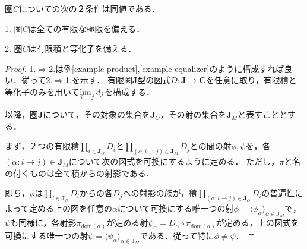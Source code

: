 \documentclass[uplatex, 12pt, dvipdfmx]{jsarticle}
\begin{document}
\begin{proposition}\label{prop-necessaries-for-limits}
    圏$C$についての次の２条件は同値である．

    1. 圏$C$は全ての有限な極限を備える．

    2. 圏$C$は有限積と等化子を備える．
\end{proposition}
\begin{proof}
    1.$\Rightarrow$2.は例\ref{example-product},\ref{example-equalizer}のように構成すれば良い．従って2.$\Rightarrow$1.を示す．
    有限圏$\mathbf{J}$型の図式$D:\mathbf{J}\to\mathbf{C}$を任意に取り，有限積と等化子のみを用いて$\varprojlim_{j}d_j$を構成する．

    以降，圏$\mathbf{J}$について，その対象の集合を$\mathbf{J}_O$，その射の集合を$\mathbf{J}_M$と表すこととする．
    
    まず，２つの有限積$\prod_{i\in\mathbf{J}_O}D_i$と$\prod_{(\alpha:i\to j)\in\mathbf{J}_M}D_j$との間の射$\phi,\psi$を，各$(\alpha:i\to j)\in\mathbf{J}_M$について次の図式を可換にするように定める．
    ただし，$\pi$と名の付くものは全て積からの射影である．
    \begin{center}
    \end{center}
    即ち，$\phi$は$\prod_{i\in\mathbf{J}_O}D_i$からの各$D_j$への射影の族が，積$\prod_{(\alpha:i\to j)\in\mathbf{J}_O}D_i$の普遍性によって定める上の図を任意の$\alpha$について可換にする唯一つの射$\phi=\langle\phi_\alpha\rangle_{\alpha\in\mathbf{J}_M}$で，$\psi$も同様に，各射影$\pi_{\mathrm{dom}(\alpha)}$が定める射$\psi_\alpha=D_\alpha\circ\pi_{\mathrm{dom}(\alpha)}$が定める，上の図式を可換にする唯一つの射$\psi=\langle\psi_\alpha\rangle_{\alpha\in\mathbf{J}_M}$である．従って特に$\phi\ne\psi$．


\end{proof}
\end{document}

